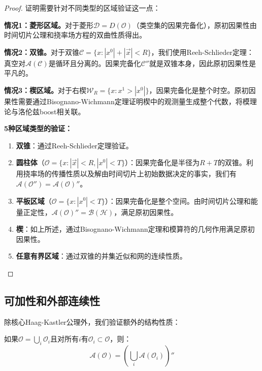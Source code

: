 \begin{proof}
证明需要针对不同类型的区域验证这一点：

\textbf{情况1：菱形区域。}对于菱形$\mathcal{D} = D(\mathcal{O})$（类空集的因果完备化），原初因果性由时间切片公理和挠率场方程的双曲性质得出。

\textbf{情况2：双锥。}对于双锥$\mathcal{C} = \{ x : |x^0| + |\vec{x}| < R \}$，我们使用Reeh-Schlieder定理：真空对$\mathcal{A}(\mathcal{C})$是循环且分离的。因果完备化$\mathcal{C}''$就是双锥本身，因此原初因果性是平凡的。

\textbf{情况3：楔区域。}对于右楔$\mathcal{W}_R = \{ x : x^1 > |x^0| \}$，因果完备化是整个时空。原初因果性需要通过Bisognano-Wichmann定理证明楔中的观测量生成整个代数，将模理论与洛伦兹boost相关联。

\textbf{5种区域类型的验证：}

\begin{enumerate}
    \item \textbf{双锥}：通过Reeh-Schlieder定理验证。
    
    \item \textbf{圆柱体}（$\mathcal{O} = \{x : |\vec{x}| < R, |x^0| < T\}$）：因果完备化是半径为$R+T$的双锥。利用挠率场的传播性质以及解由时间切片上初始数据决定的事实，我们有$\mathcal{A}(\mathcal{O}'') = \mathcal{A}(\mathcal{O})''$。
    
    \item \textbf{平板区域}（$\mathcal{O} = \{x : |x^0| < T\}$）：因果完备化是整个空间。由时间切片公理和能量正定性，$\mathcal{A}(\mathcal{O})'' = \mathcal{B}(\mathcal{H})$，满足原初因果性。
    
    \item \textbf{楔}：如上所述，通过Bisognano-Wichmann定理和模算符的几何作用满足原初因果性。
    
    \item \textbf{任意有界区域}：通过双锥的并集近似和网的连续性质。
\end{enumerate}
\end{proof}

\subsection{可加性和外部连续性}

除核心Haag-Kastler公理外，我们验证额外的结构性质：

\begin{theorem}[可加性]
如果$\mathcal{O} = \bigcup_i \mathcal{O}_i$且对所有$i$有$\mathcal{O}_i \subset \mathcal{O}$，则：
\begin{equation}
    \mathcal{A}(\mathcal{O}) = \left( \bigcup_i \mathcal{A}(\mathcal{O}_i) \right)''
\end{equation}
\end{theorem}

